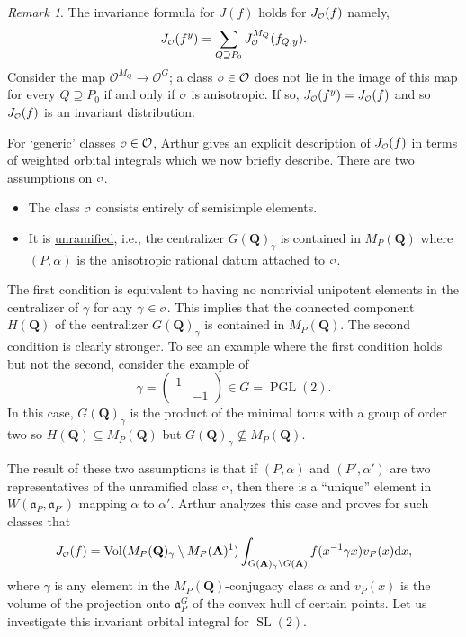 \documentclass[11pt]{amsart}
\def\A{\mathbf A}
\def\Q{\mathbf Q}
\def\O{\mathcal O}
\def\o{\scalebox{0.8}{$\scriptstyle\mathcal{O}$}}
\def\aaa{\mathfrak a}
\def\d{\text d}
\def\bs{\setminus} 			%
\def\sl{\operatorname{SL}}
\def\vol{\operatorname{Vol}}
\theoremstyle{remark}
\newtheorem{remark}[theorem]{Remark}
\begin{document}
\begin{remark}
	The invariance formula for $J(f)$ holds for $J_{\o}(f)$ namely,
	\[ J_{\o}(f^y) = \sum_{Q \supseteq P_0} J_{\o}^{M_Q}(f_{Q, y}). \]
	Consider the map $\O^{M_Q} \to \O^G$; a class $\o \in \O$ does not lie in the image of this map for every $Q \supseteq P_0$ if and only if $\o$ is anisotropic. If so, $J_{\o}(f^y) = J_{\o}(f)$ and so $J_{\o}(f)$ is an invariant distribution. 
\end{remark}

For `generic' classes $\o \in \O$, Arthur gives an explicit description of $J_{\o}(f)$ in terms of weighted orbital integrals which we now briefly describe. There are two assumptions on $\o$. 
\begin{itemize}
	\item The class $\o$ consists entirely of semisimple elements. 
	\item It is \underline{unramified}, i.e., the centralizer $G(\Q)_\gamma$ is contained in $M_P(\Q)$ where $(P, \alpha)$ is the anisotropic rational datum attached to $\o$. 
\end{itemize}
The first condition is equivalent to having no nontrivial unipotent elements in the centralizer of $\gamma$ for any $\gamma \in \o$. This implies that the connected component $H(\Q)$ of the centralizer $G(\Q)_\gamma$ is contained in $M_P(\Q)$. The second condition is clearly stronger. To see an example where the first condition holds but not the second, consider the example of 
\[ \gamma = \begin{pmatrix} 1 & \\ & -1 \end{pmatrix} \in G = \operatorname{PGL}(2). \]
In this case, $G(\Q)_\gamma$ is the product of the minimal torus with a group of order two so $H(\Q) \subseteq M_P(\Q)$ but $G(\Q)_\gamma \not\subseteq M_P(\Q)$. 

The result of these two assumptions is that if $(P, \alpha)$ and $(P', \alpha')$ are two representatives of the unramified class $\o$, then there is a ``unique'' element in $W(\aaa_P, \aaa_{P'})$ mapping $\alpha$ to $\alpha'$. Arthur analyzes this case and proves for such classes that
\begin{equation} \label{jo_anis}
	J_{\o}(f) = \vol(M_P(\Q)_\gamma \bs M_P(\A)^1) \int_{G(\A)_\gamma \bs G(\A)} f(x^{-1} \gamma x) v_P(x) \d x, 
\end{equation}
where $\gamma$ is any element in the $M_P(\Q)$-conjugacy class $\alpha$ and $v_P(x)$ is the volume of the projection onto $\aaa_P^G$ of the convex hull of certain points. Let us investigate this invariant orbital integral for $\sl(2)$. 
\end{document}

